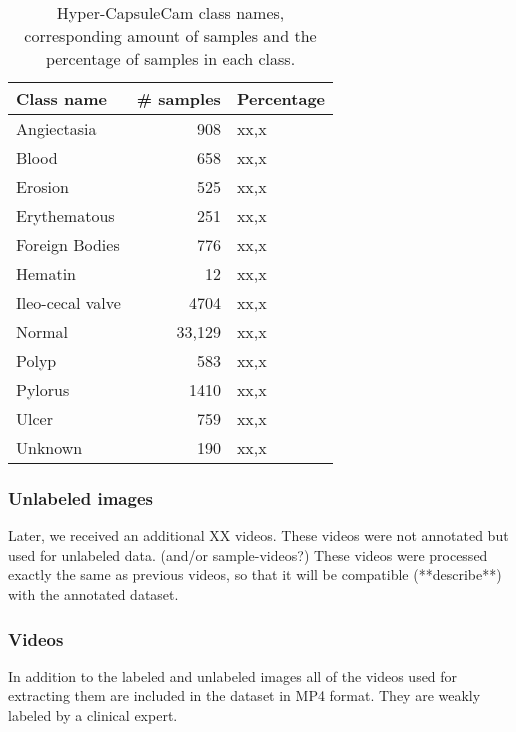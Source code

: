 \documentclass[thesis.tex]{subfiles}
\begin{document}
\begin{table} %
  \centering
  \begin{tabular}{|l|r|l|}
  	\hline
  	Class name & \# samples & Percentage \\
    \hline
    Angiectasia		& 908	& xx,x \\ 
    Blood			& 658	& xx,x \\ 
    Erosion			& 525	& xx,x \\ 
    Erythematous	& 251	& xx,x \\
    Foreign Bodies	& 776	& xx,x \\
    Hematin			& 12	& xx,x \\
    Ileo-cecal valve& 4704	& xx,x \\
    Normal			& 33,129& xx,x \\
    Polyp			& 583	& xx,x \\
    Pylorus			& 1410	& xx,x \\
    Ulcer			& 759	& xx,x \\
    Unknown			& 190	& xx,x \\
    \hline
  \end{tabular}
  \caption[Hyper-CapsuleCam class names and number of samples.]{Hyper-CapsuleCam class names, corresponding amount of samples and the percentage of samples in each class.}
  \label{table:kvasir_pillcam_samples}
\end{table}



\subsubsection{Unlabeled images}
Later, we received an additional XX videos. These videos were not annotated but used for unlabeled data. (and/or sample-videos?)
These videos were processed exactly the same as previous videos, so that it will be compatible (**describe**) with the annotated dataset.



\subsubsection{Videos}
In addition to the labeled and unlabeled images all of the videos used for extracting them are included in the dataset in MP4 format. They are weakly labeled by a clinical expert.
\end{document}
